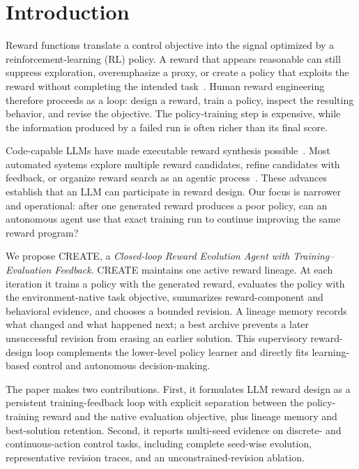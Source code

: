 \section{Introduction}
Reward functions translate a control objective into the signal optimized by a reinforcement-learning (RL) policy. A reward that appears reasonable can still suppress exploration, overemphasize a proxy, or create a policy that exploits the reward without completing the intended task~\cite{sutton2018rl,ng1999policy,hadfield2017inverse,amodei2016concrete}. Human reward engineering therefore proceeds as a loop: design a reward, train a policy, inspect the resulting behavior, and revise the objective. The policy-training step is expensive, while the information produced by a failed run is often richer than its final score.

Code-capable LLMs have made executable reward synthesis possible~\cite{language2rewards,text2reward,eureka}. Most automated systems explore multiple reward candidates, refine candidates with feedback, or organize reward search as an agentic process~\cite{card,rfagent,revolve}. These advances establish that an LLM can participate in reward design. Our focus is narrower and operational: after one generated reward produces a poor policy, can an autonomous agent use that exact training run to continue improving the same reward program?

We propose CREATE, a \emph{Closed-loop Reward Evolution Agent with Training--Evaluation Feedback}. CREATE maintains one active reward lineage. At each iteration it trains a policy with the generated reward, evaluates the policy with the environment-native task objective, summarizes reward-component and behavioral evidence, and chooses a bounded revision. A lineage memory records what changed and what happened next; a best archive prevents a later unsuccessful revision from erasing an earlier solution. This supervisory reward-design loop complements the lower-level policy learner and directly fits learning-based control and autonomous decision-making.

The paper makes two contributions. First, it formulates LLM reward design as a persistent training-feedback loop with explicit separation between the policy-training reward and the native evaluation objective, plus lineage memory and best-solution retention. Second, it reports multi-seed evidence on discrete- and continuous-action control tasks, including complete seed-wise evolution, representative revision traces, and an unconstrained-revision ablation.

